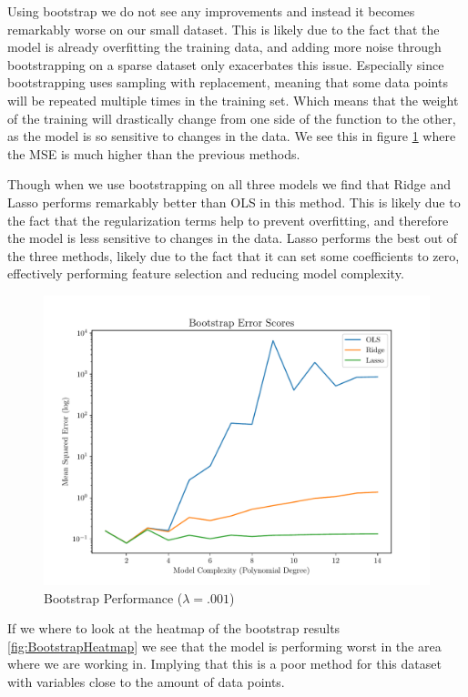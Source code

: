 \documentclass[twocolumn,aps]{revtex4}
\begin{document}
Using bootstrap we do not see any improvements and instead it becomes remarkably worse on our small dataset.
This is likely due to the fact that the model is already overfitting the training data, and adding more noise through bootstrapping on a sparse dataset only exacerbates this issue.
Especially since bootstrapping uses sampling with replacement, meaning that some data points will be repeated multiple times in the training set.
Which means that the weight of the training will drastically change from one side of the function to the other, as the model is so sensitive to changes in the data.
We see this in figure \ref{fig:BootstrapPerformance} where the MSE is much higher than the previous methods.

Though when we use bootstrapping on all three models we find that Ridge and Lasso performs remarkably better than OLS in this method.
This is likely due to the fact that the regularization terms help to prevent overfitting, and therefore the model is less sensitive to changes in the data.
Lasso performs the best out of the three methods, likely due to the fact that it can set some coefficients to zero, effectively performing feature selection and reducing model complexity.


\begin{figure}[h]
    \centering
    \includegraphics[width=.95 \linewidth]{Figures/Bootstrap.pdf}
    \caption{Bootstrap Performance ($\lambda=.001$)}
    \label{fig:BootstrapPerformance}
\end{figure}

If we where to look at the heatmap of the bootstrap results \ref{fig:BootstrapHeatmap} we see that the model is performing worst in the area where we are working in.
Implying that this is a poor method for this dataset with variables close to the amount of data points.
\end{document}
